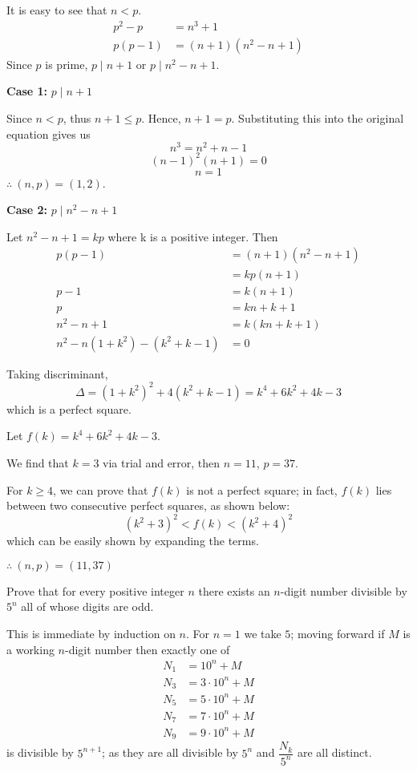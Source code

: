 \begin{solution}
It is easy to see that $n < p$.
\begin{align*}
p^2 - p &= n^3 + 1\\
p(p-1) &= (n+1)(n^2-n+1)
\end{align*}
Since $p$ is prime, $p \mid n+1$ or $p \mid n^2 - n + 1$.

\textbf{Case 1:} $p \mid n+1$

Since  $n < p$, thus $n+1 \le p$. Hence, $n+1=p$.
Substituting this into the original equation gives us 
\[n^3 = n^2 + n - 1\] 
\[(n-1)^2(n+1) = 0\] 
\[n = 1\]
$\therefore\:(n,p) = (1,2)$.

\textbf{Case 2:} $p \mid n^2 - n + 1$

Let $n^2 - n + 1 = kp$ where k is a positive integer. Then 
\begin{align*}
p(p-1) &= (n+1)(n^2-n+1)\\
&= kp(n+1)\\
p-1 &= k(n+1) \\
p &= kn + k + 1\\
n^2-n+1 &= k(kn+k+1) \\
n^2-n(1+k^2)-(k^2+k-1) &= 0
\end{align*}

Taking discriminant, 
\[\Delta = (1+k^2)^2 + 4(k^2+k-1) = k^4+6k^2+4k-3\]
which is a perfect square.

Let $f(k) = k^4+6k^2+4k-3$.

We find that $k=3$ via trial and error, then $n=11$, $p=37$.

For $k \ge 4$, we can prove that $f(k)$ is not a perfect square; in fact, $f(k)$ lies between two consecutive perfect squares, as shown below:
\[(k^2+3)^2 < f(k) < (k^2+4)^2\]
which can be easily shown by expanding the terms.

$\therefore\:(n,p) = (11,37)$
\end{solution}

\begin{prbm}
Prove that for every positive integer $n$ there exists an $n$-digit number divisible by $5^n$ all of whose digits are odd.
\end{prbm}

\begin{solution}
This is immediate by induction on $n$. For $n = 1$ we take $5$; moving forward if $M$ is a
working $n$-digit number then exactly one of
\begin{align*}
N_1 &= 10^n + M \\
N_3 &= 3 \cdot 10^n + M \\
N_5 &= 5 \cdot 10^n + M \\
N_7 &= 7 \cdot 10^n + M \\
N_9 &= 9 \cdot 10^n + M
\end{align*}
is divisible by $5^{n+1}$; as they are all divisible by $5^n$ and $\dfrac{N_k}{5^n}$ are all distinct.
\end{solution}

